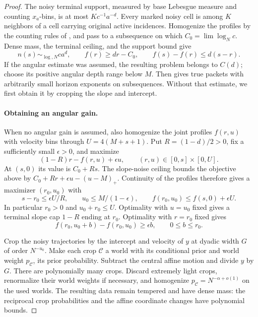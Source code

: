 \begin{proof}
The noisy terminal support, measured by base Lebesgue measure and
counting \(x_a\)-bins, is at most \(Kc^{-1}a^{-d}\).  Every
marked noisy cell is among \(K\) neighbors of a cell carrying
original active incidences.  Homogenize the profiles by the counting
rules of , and pass to a subsequence on which
\(C_0=\lim\log_Nc\).  Dense mass, the terminal ceiling, and the
support bound give
\[
 n(s)\sim_{\log,N}ca^d,\qquad f(r)\ge dr-C_0,
 \qquad f(s)-f(r)\le d(s-r).
\]
If the angular estimate was assumed, the resulting problem belongs
to \(C(d)\); choose its positive angular depth range below \(M\).
Then  gives true packets with
arbitrarily small horizon exponents on subsequences.  Without that
estimate, we first obtain it by cropping the slope and intercept.

\paragraph{Obtaining an angular gain.}
When no angular gain is assumed, also homogenize the joint profiles
\(f(r,u)\) with velocity bins through \(U=4(M+s+1)\).  Put
\(R=(1-d)/2>0\), fix a sufficiently small \(\epsilon>0\), and
maximize
\[
 (1-R)r-f(r,u)+\epsilon u,
 \qquad (r,u)\in[0,s]\times[0,U].
\]
At \((s,0)\) its value is \(C_0+Rs\).  The slope-noise ceiling
bounds the objective above by
\(C_0+Rr+\epsilon u-(u-M)_+\).  Continuity of the profiles
therefore gives a maximizer \((r_0,u_0)\) with
\[
 s-r_0\le\epsilon U/R,\qquad
 u_0\le M/(1-\epsilon),\qquad
 f(r_0,u_0)\le f(s,0)+\epsilon U.
\]
In particular \(r_0>0\) and \(u_0+r_0\le U\).  Optimality
with \(u=u_0\) fixed gives a terminal slope cap \(1-R\) ending
at \(r_0\).  Optimality with \(r=r_0\) fixed gives
\[
 f(r_0,u_0+b)-f(r_0,u_0)\ge\epsilon b,
 \qquad 0\le b\le r_0.
\]

Crop the noisy trajectories by the intercept and velocity of \(y\)
at dyadic width \(G\) of order \(N^{-u_0}\).  Make each crop
\(\mathcal C\) a world with its conditional prior and world weight
\(p_{\mathcal C}\), its prior probability.  Subtract the central
affine motion and divide \(y\) by \(G\).  There are polynomially
many crops.  Discard extremely light crops, renormalize their world
weights if necessary, and homogenize
\(p_{\mathcal C}=N^{-\alpha+o(1)}\) on the used worlds.
The resulting data remain tempered and have dense mass: the reciprocal
crop probabilities and the affine coordinate changes have polynomial
bounds.


\end{proof}
